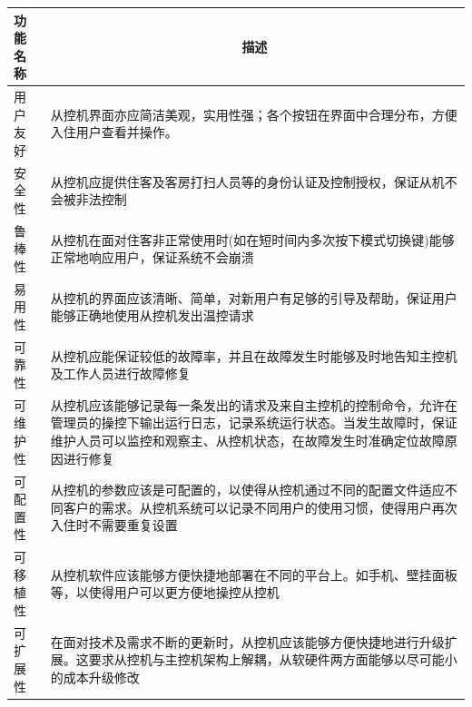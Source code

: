 \documentclass[blue,normal,cn]{elegantnote}
\begin{document}
\begin{center}
	\begin{tabular}{|>{\centering}m{}|m{}|}
		\hline
		\textbf{功能名称} & \multicolumn{1}{c|}{\textbf{描述}}                                                                                                                                                                         \\
		\hline
		用户友好          & 从控机界面亦应简洁美观，实用性强；各个按钮在界面中合理分布，方便入住用户查看并操作。                                                                                                                       \\
		\hline
		安全性            & 从控机应提供住客及客房打扫人员等的身份认证及控制授权，保证从机不会被非法控制                                                                                                                               \\
		\hline
		鲁棒性            & 从控机在面对住客非正常使用时(如在短时间内多次按下模式切换键)能够正常地响应用户，保证系统不会崩溃                                                                                                           \\
		\hline
		易用性            & 从控机的界面应该清晰、简单，对新用户有足够的引导及帮助，保证用户能够正确地使用从控机发出温控请求                                                                                                           \\
		\hline
		可靠性            & 从控机应能保证较低的故障率，并且在故障发生时能够及时地告知主控机及工作人员进行故障修复                                                                                                                     \\
		\hline
		可维护性          & 从控机应该能够记录每一条发出的请求及来自主控机的控制命令，允许在管理员的操控下输出运行日志，记录系统运行状态。当发生故障时，保证维护人员可以监控和观察主、从控机状态，在故障发生时准确定位故障原因进行修复 \\
		\hline
		可配置性          & 从控机的参数应该是可配置的，以使得从控机通过不同的配置文件适应不同客户的需求。从控机系统可以记录不同用户的使用习惯，使得用户再次入住时不需要重复设置                                                       \\
		\hline
		可移植性          & 从控机软件应该能够方便快捷地部署在不同的平台上。如手机、壁挂面板等，以使得用户可以更方便地操控从控机                                                                                                       \\
		\hline
		可扩展性          & 在面对技术及需求不断的更新时，从控机应该能够方便快捷地进行升级扩展。这要求从控机与主控机架构上解耦，从软硬件两方面能够以尽可能小的成本升级修改                                                             \\
		\hline
	\end{tabular}
\end{center}
\end{document}
